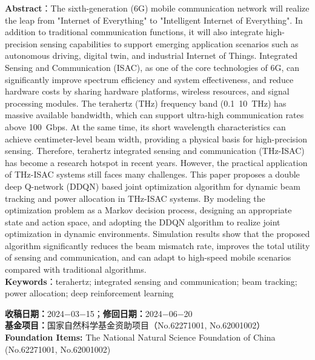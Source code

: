 \documentclass[twoside, 10pt]{ctexart}
\begin{document}
\noindent \textbf{Abstract}：The sixth-generation (6G) mobile communication network will realize the leap from "Internet of Everything" to "Intelligent Internet of Everything". In addition to traditional communication functions, it will also integrate high-precision sensing capabilities to support emerging application scenarios such as autonomous driving, digital twin, and industrial Internet of Things. Integrated Sensing and Communication (ISAC), as one of the core technologies of 6G, can significantly improve spectrum efficiency and system effectiveness, and reduce hardware costs by sharing hardware platforms, wireless resources, and signal processing modules. The terahertz (THz) frequency band (0.1~10~THz) has massive available bandwidth, which can support ultra-high communication rates above 100~Gbps. At the same time, its short wavelength characteristics can achieve centimeter-level beam width, providing a physical basis for high-precision sensing. Therefore, terahertz integrated sensing and communication (THz-ISAC) has become a research hotspot in recent years. However, the practical application of THz-ISAC systems still faces many challenges. This paper proposes a double deep Q-network (DDQN) based joint optimization algorithm for dynamic beam tracking and power allocation in THz-ISAC systems. By modeling the optimization problem as a Markov decision process, designing an appropriate state and action space, and adopting the DDQN algorithm to realize joint optimization in dynamic environments. Simulation results show that the proposed algorithm significantly reduces the beam mismatch rate, improves the total utility of sensing and communication, and can adapt to high-speed mobile scenarios compared with traditional algorithms.\\
\vspace{0.5em}
\noindent \textbf{Keywords}：terahertz; integrated sensing and communication; beam tracking; power allocation; deep reinforcement learning\\
\vspace{2em}

\noindent \textbf{收稿日期：}2024−03−15；\textbf{修回日期：}2024−06−20\\
\noindent \textbf{基金项目：}国家自然科学基金资助项目（No.62271001, No.62001002）\\
\noindent \textbf{Foundation Items:} The National Natural Science Foundation of China (No.62271001, No.62001002)\\
\vspace{2em}
\end{document}
